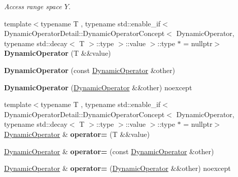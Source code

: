 \begin{DoxyCompactItemize}
\begin{DoxyCompactList}\small\item\em Access range space $Y$. \end{DoxyCompactList}\item 
{\footnotesize template$<$typename T , typename std\+::enable\+\_\+if$<$ Dynamic\+Operator\+Detail\+::\+Dynamic\+Operator\+Concept$<$ Dynamic\+Operator, typename std\+::decay$<$ T $>$\+::type $>$\+::value $>$\+::type $\ast$  = nullptr$>$ }\\{\bfseries Dynamic\+Operator} (T \&\&value)\hypertarget{classSpacy_1_1DynamicOperator_a5cc35e7a7c5a9711f465a11c81fdd29a}{}\label{classSpacy_1_1DynamicOperator_a5cc35e7a7c5a9711f465a11c81fdd29a}

\item 
{\bfseries Dynamic\+Operator} (const \hyperlink{classSpacy_1_1DynamicOperator}{Dynamic\+Operator} \&other)\hypertarget{classSpacy_1_1DynamicOperator_a7d1e9efe9b3bd482d813f90fac5c5fa8}{}\label{classSpacy_1_1DynamicOperator_a7d1e9efe9b3bd482d813f90fac5c5fa8}

\item 
{\bfseries Dynamic\+Operator} (\hyperlink{classSpacy_1_1DynamicOperator}{Dynamic\+Operator} \&\&other) noexcept\hypertarget{classSpacy_1_1DynamicOperator_a0496c72b7b18d413856ad008dbc3dfb1}{}\label{classSpacy_1_1DynamicOperator_a0496c72b7b18d413856ad008dbc3dfb1}

\item 
{\footnotesize template$<$typename T , typename std\+::enable\+\_\+if$<$ Dynamic\+Operator\+Detail\+::\+Dynamic\+Operator\+Concept$<$ Dynamic\+Operator, typename std\+::decay$<$ T $>$\+::type $>$\+::value $>$\+::type $\ast$  = nullptr$>$ }\\\hyperlink{classSpacy_1_1DynamicOperator}{Dynamic\+Operator} \& {\bfseries operator=} (T \&\&value)\hypertarget{classSpacy_1_1DynamicOperator_af03a1b856d668cbd78eaf9df83487a55}{}\label{classSpacy_1_1DynamicOperator_af03a1b856d668cbd78eaf9df83487a55}

\item 
\hyperlink{classSpacy_1_1DynamicOperator}{Dynamic\+Operator} \& {\bfseries operator=} (const \hyperlink{classSpacy_1_1DynamicOperator}{Dynamic\+Operator} \&other)\hypertarget{classSpacy_1_1DynamicOperator_a4c7e142093149504287dc0e4f2a7c9df}{}\label{classSpacy_1_1DynamicOperator_a4c7e142093149504287dc0e4f2a7c9df}

\item 
\hyperlink{classSpacy_1_1DynamicOperator}{Dynamic\+Operator} \& {\bfseries operator=} (\hyperlink{classSpacy_1_1DynamicOperator}{Dynamic\+Operator} \&\&other) noexcept\hypertarget{classSpacy_1_1DynamicOperator_a70023d434a687589299918a4ffaf6eee}{}\label{classSpacy_1_1DynamicOperator_a70023d434a687589299918a4ffaf6eee}


\end{DoxyCompactItemize}
